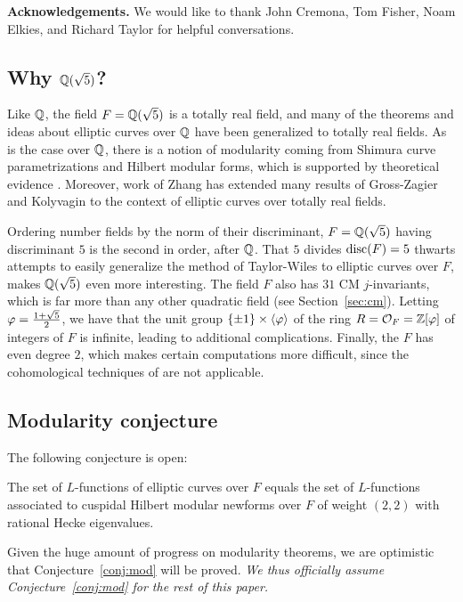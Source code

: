\documentclass{amsart}
\begin{document}
{\bf Acknowledgements.} We would like
to thank John Cremona, Tom Fisher, Noam Elkies, and Richard Taylor
for helpful conversations.
 
\subsection{Why $\mathbb{Q}(\sqrt{5})$?}

Like $\mathbb{Q}$, the field $F=\mathbb{Q}(\sqrt{5})$ is a totally real field, and
many of the theorems and ideas about elliptic curves over 
$\mathbb{Q}$ have been generalized to totally real fields. As is the case over $\mathbb{Q}$, there is a 
notion of modularity coming from Shimura curve parametrizations and Hilbert modular forms,
 which is supported by theoretical evidence \cite{}.%
Moreover,  work \cite{zhang:heightsshimura} of Zhang has extended many results
of Gross-Zagier \cite{gross-zagier} and Kolyvagin \cite{kolyvagin:mordellweil} 
to the context of elliptic curves over totally real fields.

Ordering number fields by the norm of their discriminant,  $F=\mathbb{Q}(\sqrt{5})$ having discriminant $5$ is
the second in order, after $\mathbb{Q}$. That $5$ divides $\operatorname{disc}(F)=5$ thwarts
attempts to easily generalize the method of Taylor-Wiles to elliptic
curves over $F$, makes $\mathbb{Q}(\sqrt{5})$ even more interesting. The
field $F$ also has $31$ CM $j$-invariants, which is far more than any
other quadratic field (see Section~\ref{sec:cm}).  Letting
$\varphi=\frac{1+\sqrt{5}}{2}$, we have that the unit group $\{\pm 1\} \times
\langle \varphi \rangle$ of the ring $R=\mathcal{O}_F=\mathbb{Z}[\varphi]$ of integers of
$F$ is infinite, leading to additional complications.  Finally,
the $F$ has even degree $2$, which makes certain
computations more difficult, since the cohomological techniques of
\cite{greenberg-voight:shimura} are not applicable.


\subsection{Modularity conjecture}\label{sec:mod}
The following conjecture is open:
\begin{conjecture}[Modularity]\label{conj:mod}
  The set of $L$-functions of elliptic curves over $F$ equals the set
  of $L$-functions associated to cuspidal Hilbert modular newforms
  over $F$ of weight $(2,2)$ with rational Hecke eigenvalues.
\end{conjecture}
Given the huge amount of progress on modularity theorems, we are
optimistic that Conjecture~\ref{conj:mod} will be proved.  {\em We
  thus officially assume Conjecture~\ref{conj:mod} for the rest of
  this paper.}
\end{document}
